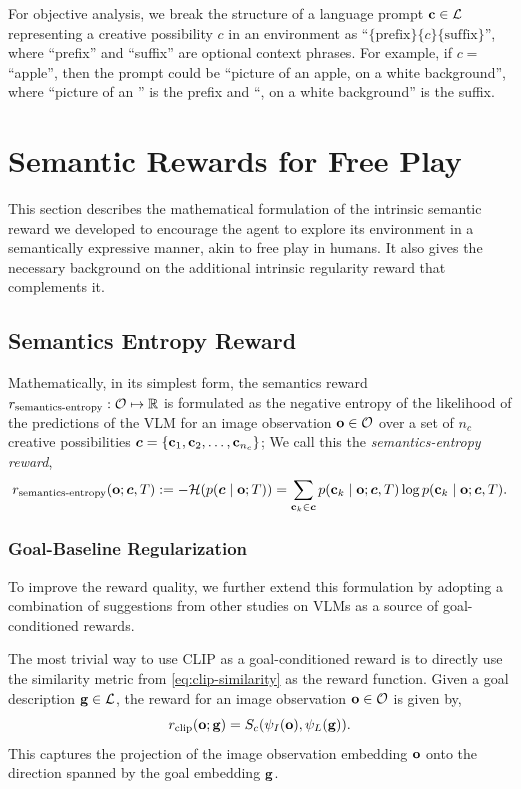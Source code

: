 For objective analysis, we break the structure of a language prompt \(\mathbf{c} \in \mathcal{L}\) representing a creative possibility \(c\) in an environment as ``\(\{\text{prefix}\}\{c\}\{\text{suffix}\}\)'', where ``prefix'' and ``suffix'' are optional context phrases. For example, if \(c =\) ``apple'', then the prompt could be ``picture of an apple, on a white background'', where ``picture of an '' is the prefix and ``, on a white background'' is the suffix.

\section{Semantic Rewards for Free Play}
\label{sec:semantics-reward}
This section describes the mathematical formulation of the intrinsic semantic reward we developed to encourage the agent to explore its environment in a semantically expressive manner, akin to free play in humans.
It also gives the necessary background on the additional intrinsic regularity reward that complements it.

\subsection{Semantics Entropy Reward}
\label{sec:entropy-reward}

Mathematically, in its simplest form, the semantics reward \(r_{\text{semantics-entropy}}: \mathcal{O} \mapsto \mathbb{R}\) is formulated as the negative entropy of the likelihood of the predictions of the VLM for an image observation \(\mathbf{o} \in \mathcal{O}\) over a set of \(n_c\) creative possibilities \(\bm{c} = \{ \mathbf{c}_1, \mathbf{c}_2, \ldots, \mathbf{c}_{n_c} \}\);
We call this the \emph{semantics-entropy reward},
\begin{equation}
    \label{eq:entropy-reward}
    r_{\text{semantics-entropy}}(\mathbf{o}; \bm{c}, T) := -\mathcal{H}(p(\bm{c} \mid \mathbf{o}; T)) = \sum_{\mathbf{c}_k \in \bm{c}} p(\mathbf{c}_k \mid \mathbf{o}; \bm{c}, T) \log p(\mathbf{c}_k \mid \mathbf{o}; \bm{c}, T).
\end{equation}
% 
\subsubsection{Goal-Baseline Regularization}
\label{sec:goal-baseline}
To improve the reward quality, we further extend this formulation by adopting a combination of suggestions from other studies on VLMs as a source of goal-conditioned rewards.

The most trivial way to use CLIP as a goal-conditioned reward is to directly use the similarity metric from \eqref{eq:clip-similarity} as the reward function.
Given a goal description \(\mathbf{g} \in \mathcal{L}\), the reward for an image observation \(\mathbf{o} \in \mathcal{O}\) is given by,
\begin{equation}
    \label{eq:trivial-reward}
    r_{\text{clip}}(\mathbf{o}; \mathbf{g}) = S_c(\psi_I(\mathbf{o}), \psi_L(\mathbf{g})).
\end{equation}
This captures the projection of the image observation embedding \(\mathbf{o}\) onto the direction spanned by the goal embedding \(\mathbf{g}\).

